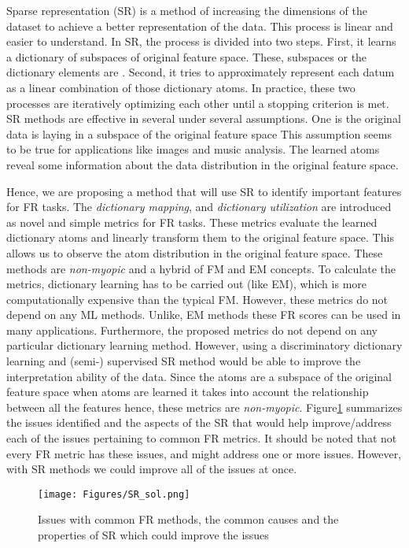 Sparse representation (SR) is a method of increasing the dimensions of the dataset to achieve a better representation of the data\cite{Elad2010}. This process is linear and easier to understand. In SR, the process is divided into two steps. First, it learns a dictionary of subspaces of original feature space. These, subspaces or the dictionary elements are . Second, it tries to approximately represent each datum as a linear combination of those dictionary atoms. In practice, these two processes are iteratively optimizing each other until a stopping criterion is met. SR methods are effective in several under several assumptions. One is the original data is laying in a subspace of the original feature space This assumption seems to be true for applications like images and music analysis. The learned atoms reveal some information about the data distribution in the original feature space. 

Hence, we are proposing a method that will use SR to identify important features for FR tasks. The \textit{dictionary mapping}, and \textit{dictionary utilization} are introduced as novel and simple metrics for FR tasks. These metrics evaluate the learned dictionary atoms and linearly transform them to the original feature space. This allows us to observe the atom distribution in the original feature space. These methods are \textit{non-myopic} and a hybrid of FM and EM concepts. To calculate the metrics, dictionary learning has to be carried out (like EM), which is more computationally expensive than the typical FM\@. However, these metrics do not depend on any ML methods. Unlike, EM methods these FR scores can be used in many applications. Furthermore, the proposed metrics do not depend on any particular dictionary learning method. However, using a discriminatory dictionary learning and (semi-) supervised SR method would be able to improve the interpretation ability of the data. Since the atoms are a subspace of the original feature space when atoms are learned it takes into account the relationship between all the features hence, these metrics are \textit{non-myopic}. Figure\ref{fig: SR_sol} summarizes the issues identified and the aspects of the SR that would help improve/address each of the issues pertaining to common FR metrics. It should be noted that not every FR metric has these issues, and might address one or more issues. However, with SR methods we could improve all of the issues at once.

\begin{figure}[!t]
    \centering
    \texttt{[image: Figures/SR\_sol.png]}
    \caption{Issues with common FR methods, the common causes and the properties of SR which could improve the issues}\label{fig: SR_sol}
\end{figure}

